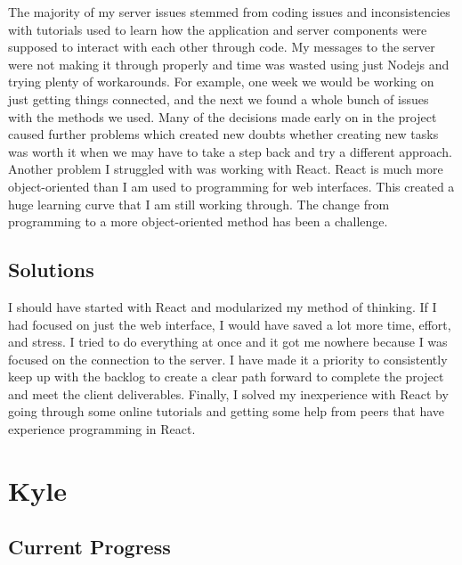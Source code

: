 \documentclass[draftclsnofoot, onecolumn, compsoc, 10pt]{IEEEtran}
\begin{document}
The majority of my server issues stemmed from coding issues and inconsistencies with tutorials used to learn how the application and server components were supposed to interact with each other through code. My messages to the server were not making it through properly and time was wasted using just Nodejs and trying plenty of workarounds. For example, one week we would be working on just getting things connected, and the next we found a whole bunch of issues with the methods we used. Many of the decisions made early on in the project caused further problems which created new doubts whether creating new tasks was worth it when we may have to take a step back and try a different approach. Another problem I struggled with was working with React. React is much more object-oriented than I am used to programming for web interfaces. This created a huge learning curve that I am still working through. The change from programming to a more object-oriented method has been a challenge. 


\subsection{Solutions}
I should have started with React and modularized my method of thinking. If I had focused on just the web interface, I would have saved a lot more time, effort, and stress. I tried to do everything at once and it got me nowhere because I was focused on the connection to the server. I have made it a priority to consistently keep up with the backlog to create a clear path forward to complete the project and meet the client deliverables. Finally, I solved my inexperience with React by going through some online tutorials and getting some help from peers that have experience programming in React. 



%



\newpage
\section{Kyle}
\subsection{Current Progress}
\end{document}
